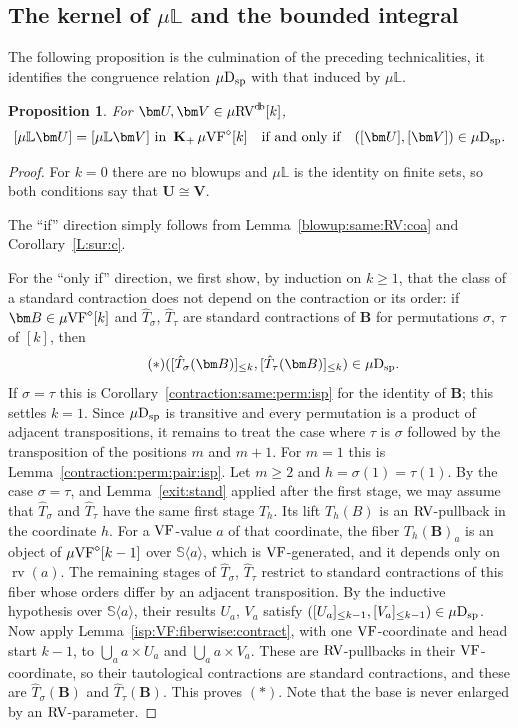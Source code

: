\documentclass[12pt]{amsart}
\theoremstyle{plain}
\newtheorem{prop}[thm]{Proposition}
\theoremstyle{definition}
\theoremstyle{remark}
\numberwithin{equation}{section}
\theoremstyle{plain}
\newcommand{\VF}{\textup{VF}}
\newcommand{\RV}{\textup{RV}}
\newcommand{\0}{\emptyset}
\newcommand{\bb}[1]{\mathbb{#1}}
\newcommand{\la}{\langle}
\newcommand{\ra}{\rangle}
\newcommand{\mVF}{{\mu}{\VF}}
\newcommand{\mRV}{{\mu}{\RV}}
\newcommand{\dsp}{\textup{D}_{\textup{sp}}}
\newcommand{\mispdb}{\mu \dsp}
\newcommand{\mL}{{\mu}{\bb L}}
\DeclareMathOperator{\rv}{rv}
\DeclareMathOperator{\gsk}{\mathbf{K}_+}
\DeclareMathOperator{\db}{d \! b}
\begin{document}
\subsection{The kernel of $\mL$ and the bounded integral}

The following proposition is the culmination of the preceding technicalities, it identifies the
congruence relation  $\mispdb$ with that induced by
$\mL$.


\begin{prop}\label{kernel:L}
For $\bm U, \bm V \in \mRV^{\db}[k]$,
\[
[\mu\bb L \bm U] = [\mu\bb L \bm V] \text{ in }\gsk \mVF^\diamond[k] \quad \text{if and only if} \quad ([\bm U], [\bm V]) \in \mispdb.
\]
\end{prop}
\begin{proof}
For $k = 0$ there are no blowups and $\mL$ is the identity on finite sets, so both conditions say that $\bm U \cong \bm V$.

The ``if'' direction simply follows from Lemma~\ref{blowup:same:RV:coa} and Corollary~\ref{L:sur:c}.

For the ``only if'' direction, we first show, by induction on $k \geq 1$, that the class of a standard contraction does not depend on the contraction or its order: if $\bm B \in \mVF^\diamond[k]$ and $\hat T_\sigma$, $\hat T_\tau$ are standard contractions of $\bm B$ for permutations $\sigma$, $\tau$ of $[k]$, then
\begin{equation*}\tag{$\ast$}
([\hat T_\sigma(\bm B)]_{\leq k}, [\hat T_\tau(\bm B)]_{\leq k}) \in \mispdb.
\end{equation*}
If $\sigma = \tau$ this is Corollary~\ref{contraction:same:perm:isp} for the identity of $\bm B$; this settles $k = 1$. Since $\mispdb$ is transitive and every permutation is a product of adjacent transpositions, it remains to treat the case where $\tau$ is $\sigma$ followed by the transposition of the positions $m$ and $m+1$. For $m = 1$ this is Lemma~\ref{contraction:perm:pair:isp}. Let $m \geq 2$ and $h = \sigma(1) = \tau(1)$. By the case $\sigma = \tau$, and Lemma~\ref{exit:stand} applied after the first stage, we may assume that $\hat T_\sigma$ and $\hat T_\tau$ have the same first stage $T_h$. Its lift $T_h(B)$ is an $\RV$-pullback in the coordinate $h$. For a $\VF$-value $a$ of that coordinate, the fiber $T_h(\bm B)_a$ is an object of $\mVF^\diamond[k-1]$ over $\mathbb S \la a \ra$, which is $\VF$-generated, and it depends only on $\rv(a)$. The remaining stages of $\hat T_\sigma$, $\hat T_\tau$ restrict to standard contractions of this fiber whose orders differ by an adjacent transposition. By the inductive hypothesis over $\mathbb S \la a \ra$, their results $U_a$, $V_a$ satisfy $([U_a]_{\leq k-1}, [V_a]_{\leq k-1}) \in \mispdb$. Now apply Lemma~\ref{isp:VF:fiberwise:contract}, with one $\VF$-coordinate and head start $k-1$, to $\bigcup_a a \times U_a$ and $\bigcup_a a \times V_a$. These are $\RV$-pullbacks in their $\VF$-coordinate, so their tautological contractions are standard contractions, and these are $\hat T_\sigma(\bm B)$ and $\hat T_\tau(\bm B)$. This proves $(\ast)$. Note that the base is never enlarged by an $\RV$-parameter.


\end{proof}
\end{document}
